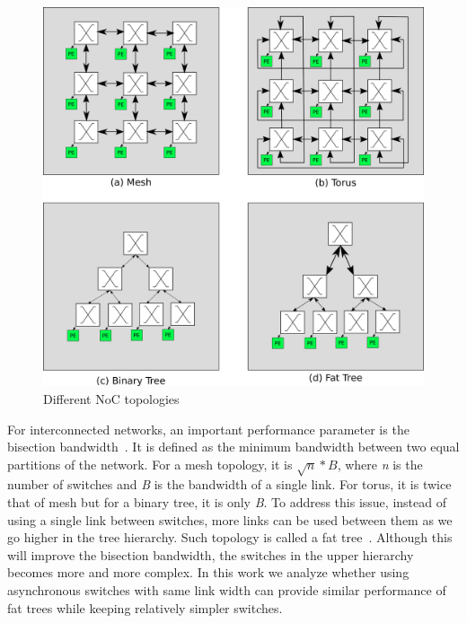 \begin{figure}[t]
\centering
   \includegraphics[width=\columnwidth]{Figures/topologies.pdf}
   \caption{Different NoC topologies}
   \label{fig:topologies}
\end{figure}

For interconnected networks, an important performance parameter is the bisection bandwidth~\cite{Wen-Chung2012}.
It is defined as the minimum bandwidth between two equal partitions of the network.
For a mesh topology, it is $\sqrt{n}*B$, where \emph{n} is the number of switches and \emph{B} is the bandwidth of a single link.
For torus, it is twice that of mesh but for a binary tree, it is only \emph{B}.
To address this issue, instead of using a single link between switches, more links can be used between them as we go higher in the tree hierarchy.
Such topology is called a fat tree~\cite{Leiserson1985,Ohring1995}. 
Although this will improve the bisection bandwidth, the switches in the upper hierarchy becomes more and more complex.
In this work we analyze whether using asynchronous switches with same link width can provide similar performance of fat trees while keeping relatively simpler switches.

